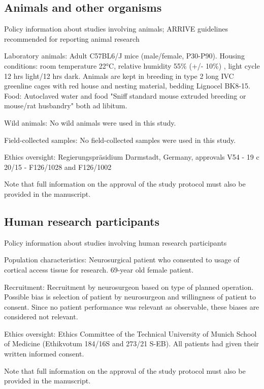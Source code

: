 \documentclass{article}
\begin{document}
\subsection*{Animals and other organisms}
Policy information about studies involving animals; ARRIVE guidelines recommended for reporting animal research

\noindent Laboratory animals: Adult C57BL6/J mice (male/female, P30-P90). Housing conditions: room temperature 22°C, relative humidity 55\% (+/- 10\%) , light cycle 12 hrs light/12 hrs dark. Animals are kept in breeding in type 2 long IVC greenline cages with red house and nesting material, bedding Lignocel BK8-15.\\
Food: Autoclaved water and food "Sniff standard mouse extruded breeding or mouse/rat husbandry" both ad libitum.

\noindent Wild animals: No wild animals were used in this study.

\noindent Field-collected samples: No field-collected samples were used in this study.

\noindent Ethics oversight: Regierungspräsidium Darmstadt, Germany, approvals V54 - 19 c 20/15 - F126/1028 and F126/1002

{\small Note that full information on the approval of the study protocol must also be provided in the manuscript.}

\subsection*{Human research participants}
Policy information about studies involving human research participants

\noindent Population characteristics: Neurosurgical patient who consented to usage of cortical access tissue for research. 69-year old female patient.

\noindent Recruitment: Recruitment by neurosurgeon based on type of planned operation. Possible bias is selection of patient by neurosurgeon and willingness of patient to consent. Since no patient performance was relevant as observable, these biases are considered not relevant.

\noindent Ethics oversight: Ethics Committee of the Technical University of Munich School of Medicine (Ethikvotum 184/16S and 273/21 S-EB). All patients had given their written informed consent.

{\small Note that full information on the approval of the study protocol must also be provided in the manuscript.}
\end{document}
